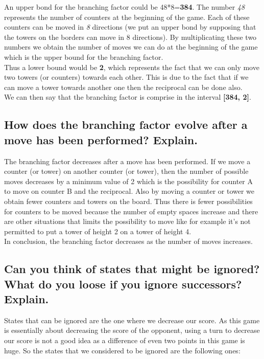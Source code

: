 \documentclass[10pt,a4paper]{article}
\begin{document}
An upper bond for the branching factor could be 48*8=\textbf{384}. The number \textit{48} represents the number of counters at the beginning of the game. Each of these counters can be moved in \textit{8} directions (we put an upper bond by supposing that the towers on the borders can move in 8 directions). By multiplicating these two numbers we obtain the number of moves we can do at the beginning of the game which is the upper bound for the branching factor. \\

Thus a lower bound would be \textbf{2}, which represents the fact that we can only move two towers (or counters) towards each other. This is due to the fact that if we can move a tower towards another one then the reciprocal can be done also.\\

We can then say that the branching factor is comprise in the interval \textbf{[384, 2]}.

\subsection{How does the branching factor evolve after a move has been performed? Explain.}

The branching factor decreases after a move has been performed. If we move a counter (or tower) on another counter (or tower), then the number of possible moves decreases by a minimum value of 2 which is the possibility for counter A to move on counter B and the reciprocal. Also by moving a counter or tower we obtain fewer counters and towers on the board. Thus there is fewer possibilities for counters to be moved because the number of empty spaces increase and there are other situations that limits the possibility to move like for example it's not permitted to put a tower of height 2 on a tower of height 4. \\

In conclusion, the branching factor decreases as the number of moves increases.

\subsection{Can you think of states that might be ignored? What do you loose if you ignore successors? Explain.}

States that can be ignored are the one where we decrease our score. As this game is essentially about decreasing the score of the opponent, using a turn to decrease our score is not a good idea as a difference of even two points in this game is huge. So the states that we considered to be ignored are the following ones:
\end{document}
